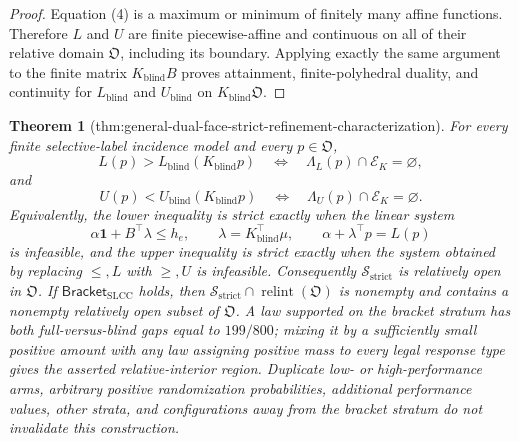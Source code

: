 \documentclass{article}
\newtheorem{theorem}{Theorem}
\begin{document}
\begin{proof}
Equation (4) is a maximum or minimum of finitely many affine functions.  Therefore \(L\) and \(U\) are finite piecewise-affine and continuous on all of their relative domain \(\mathfrak O\), including its boundary.  Applying exactly the same argument to the finite matrix \(K_{\mathrm{blind}}B\) proves attainment, finite-polyhedral duality, and continuity for \(L_{\mathrm{blind}}\) and \(U_{\mathrm{blind}}\) on \(K_{\mathrm{blind}}\mathfrak O\).
\end{proof}

\begin{theorem}[thm:general-dual-face-strict-refinement-characterization]\label{thm:general-dual-face-strict-refinement-characterization}
For every finite selective-label incidence model and every \(p\in\mathfrak O\),
\[
L(p)>L_{\mathrm{blind}}(K_{\mathrm{blind}}p)
\quad\Longleftrightarrow\quad
\Lambda_L(p)\cap\mathcal E_K=\varnothing,
\]
and
\[
U(p)<U_{\mathrm{blind}}(K_{\mathrm{blind}}p)
\quad\Longleftrightarrow\quad
\Lambda_U(p)\cap\mathcal E_K=\varnothing.
\]
Equivalently, the lower inequality is strict exactly when the linear system
\[
\alpha\mathbf 1+B^{\top}\lambda\leq h_e,\qquad
\lambda=K_{\mathrm{blind}}^{\top}\mu,\qquad
\alpha+\lambda^{\top}p=L(p)
\]
is infeasible, and the upper inequality is strict exactly when the system obtained by replacing \(\leq,L\) with \(\geq,U\) is infeasible.  Consequently \(\mathcal S_{\mathrm{strict}}\) is relatively open in \(\mathfrak O\).  If \(\mathsf{Bracket}_{\mathrm{SLCC}}\) holds, then \(\mathcal S_{\mathrm{strict}}\cap\operatorname{relint}(\mathfrak O)\) is nonempty and contains a nonempty relatively open subset of \(\mathfrak O\).  A law supported on the bracket stratum has both full-versus-blind gaps equal to \(199/800\); mixing it by a sufficiently small positive amount with any law assigning positive mass to every legal response type gives the asserted relative-interior region.  Duplicate low- or high-performance arms, arbitrary positive randomization probabilities, additional performance values, other strata, and configurations away from the bracket stratum do not invalidate this construction.
\end{theorem}
\end{document}
